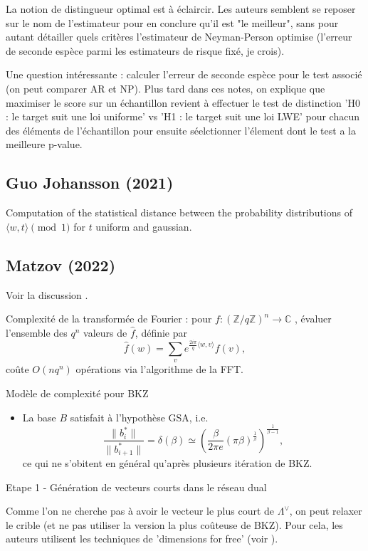 \documentclass{article}
\begin{document}
La notion de distingueur optimal est à éclaircir. Les auteurs semblent se reposer sur le nom de l'estimateur pour en conclure qu'il est "le meilleur", sans pour autant détailler quels critères l'estimateur de Neyman-Person optimise (l'erreur de seconde espèce parmi les estimateurs de risque fixé, je crois).

Une question intéressante : calculer l'erreur de seconde espèce pour le test associé (on peut comparer AR et NP). Plus tard dans ces notes, on explique que maximiser le score sur un échantillon revient à effectuer le test de distinction 'H0 : le target suit une loi uniforme' vs 'H1 : le target suit une loi LWE' pour chacun des éléments de l'échantillon pour ensuite séelctionner l'élement dont le test a la meilleure p-value.

\subsection{Guo Johansson (2021)}

Computation of the statistical distance between the probability distributions of $\langle w , t \rangle \pmod{1}$ for $t$ uniform and gaussian.  

\subsection{Matzov (2022)}

Voir la discussion .

Complexité de la transformée de Fourier : pour $f : (\mathbb Z/q\mathbb Z )^n \rightarrow \mathbb C $ , évaluer l'ensemble des $q^n$ valeurs de $\hat f$, définie par  
\[\hat f (w) = \sum_{v} e^{\frac{2i\pi}{q}\langle w,v\rangle } f(v),\]
coûte $O(nq^n)$ opérations via l'algorithme de la FFT.

Modèle de complexité pour BKZ
\begin{itemize} 
\item La base $B$ satisfait à l'hypothèse GSA, i.e.
\[\frac{ \|b_{i}^*\| }{\|b_{i+1}^*\|} = \delta(\beta) \simeq (\frac{\beta}{2\pi e}(\pi\beta)^{\frac{1}{\beta}} )^{\frac{1}{\beta-1}},\]
ce qui ne s'obitent en général qu'après plusieurs itération de BKZ.
\end{itemize}

Etape 1 - Génération de vecteurs courts dans le réseau dual

Comme l'on ne cherche pas à avoir le vecteur le plus court de $\Lambda^\vee$, on peut relaxer le crible (et ne pas utiliser la version la plus coûteuse de BKZ). Pour cela, les auteurs utilisent les techniques de 'dimensions for free' (voir \cite{ducas2018shortest}). 
\end{document}
